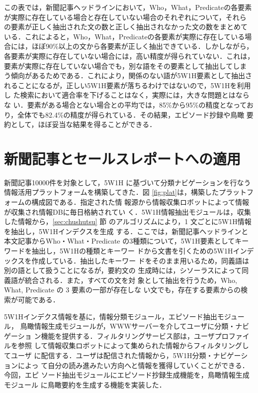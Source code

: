 この表では，新聞記事ヘッドラインにおいて，Who，What，Predicateの各要素
が実際に存在している場合と存在していない場合のそれぞれについて，それら
の要素が正しく抽出された文の数と正しく抽出されなかった文の数をまとめて
いる．これによると，Who，What，Predicateの各要素が実際に存在している場
合には，ほぼ90\%以上の文から各要素が正しく抽出できている．しかしながら，
各要素が実際に存在していない場合には，高い精度が得られていない．これは，
要素が実際に存在していない場合でも，別な語をその要素として抽出してしま
う傾向があるためである．これにより，関係のない語が5W1H要素として抽出さ
れることになるが，正しい5W1H要素が落ちるわけではないので，5W1Hを利用し
た検索において適合率を下げることはなく，実際には，大きな問題とはならな
い．要素がある場合とない場合との平均では，85\%から95\%の精度となってお
り，全体でも82.4\%の精度が得られている．その結果，エピソード抄録や鳥瞰
要約として，ほぼ妥当な結果を得ることができる．

\section{新聞記事とセールスレポートへの適用}

新聞記事10000件を対象として，5W1H に基づいて分類ナビゲーションを行なう
情報活用プラットフォームを構築してきた\cite{okumura97}．図
\ref{fig:plat}は，構築したプラットフォームの構成図である．指定された情
報源から情報収集ロボットによって情報が収集され情報DBに毎日格納されてい
く．5W1H情報抽出モジュールは，収集した情報から，\ref{sec:chushutsu} 節
のアルゴリズムにより，1 文ごとに5W1H情報を抽出し，5W1Hインデクスを生成
する．ここでは，新聞記事ヘッドラインと本文記事からWho・What・Predicate
の3種類について，5W1H要素としてキーワードを抽出し，5W1Hの種類とキーワー
ドから文書を引くための5W1Hインデックスを作成している．抽出したキーワー
ドをそのまま用いるため，同義語は別の語として扱うことになるが，要約文の
生成時には，シソーラスによって同義語が統合される．また，すべての文を対
象として抽出を行うため，Who, What, Predicate の 3 要素の一部が存在しな
い文でも，存在する要素からの検索が可能である．

5W1Hインデクス情報を基に，情報分類モジュール，エピソード抽出モジュール，
鳥瞰情報生成モジュールが，WWWサーバーを介してユーザに分類・ナビゲーショ
ン機能を提供する．フィルタリングサービス部は，ユーザプロファイルを参照
して情報収集ロボットによって集められた情報からフィルタリングしてユーザ
に配信する．ユーザは配信された情報から，5W1H分類・ナビゲーションによっ
て自分の読み進みたい方向へと情報を獲得していくことができる．今回，エピ
ソード抽出モジュールにエピソード抄録生成機能を，鳥瞰情報生成モジュール
に鳥瞰要約を生成する機能を実装した．

